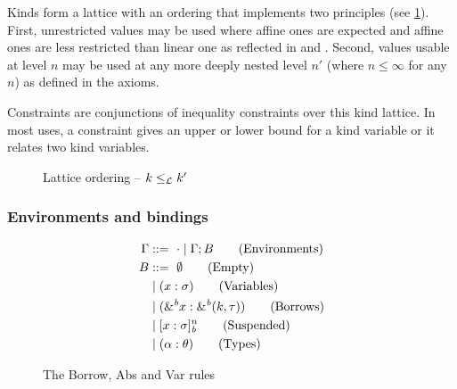 Kinds form a lattice with an ordering that implements two principles
(see \cref{sdtyp:lattice}). First, unrestricted values may be used
where affine ones are expected and affine ones are less restricted
than linear one as reflected in  and .
Second, values usable at level $n$ may be used at any more deeply
nested level $n'$ (where $n\le\infty$ for any $n$) as defined in the  axioms. 

Constraints are conjunctions of inequality constraints over this kind
lattice. In most uses, a constraint gives an upper or lower bound for
a kind variable or it relates two kind variables.

\begin{figure*}[tp]
  
  \caption{Lattice ordering -- $k \leq_\mathcal L k'$}
  \label{sdtyp:lattice}
\end{figure*}


\subsubsection{Environments and bindings}
\label{sdtyping:envs}
\begin{figure}[tp]
  \begin{minipage}{0.33\linewidth}
    \begin{align*}
      \Gamma &::=\ \cdot \mid \Gamma;B\tag{Environments}\\
      B &::=\ \emptyset \tag{Empty} \\
         &\mid (x : \sigma)\tag{Variables}\\
         &\mid ({\&}^{\textit{b}}x : {\&}^{\textit{b}}(k,\tau))\tag{Borrows}\\
         &\mid [x : \sigma]_{\textit{b}}^n \tag{Suspended}\\
         &\mid (\alpha : \theta)\tag{Types}
    \end{align*}
    \caption{Type environments}
    \label{grammar:env}
  \end{minipage}\hfill
  \begin{minipage}{0.65\linewidth}
    \caption{The {\sc Borrow}, {\sc Abs} and {\sc Var} rules}
    \label{selectrules:borrow}
    \label{selectrules:binders}
  \end{minipage}
\end{figure}

